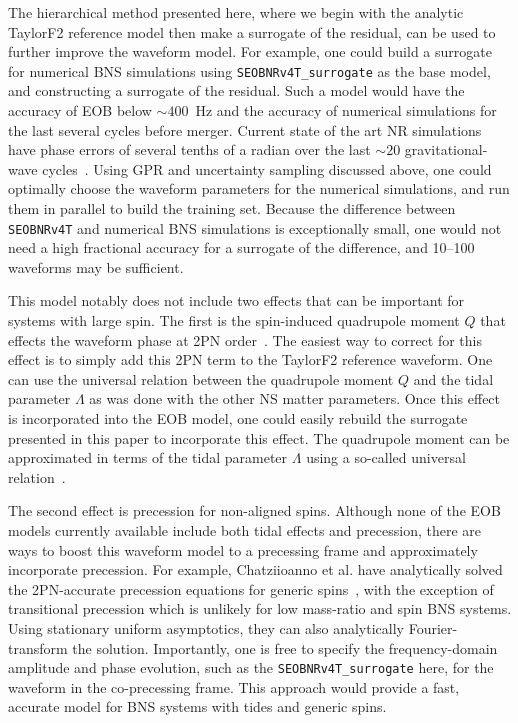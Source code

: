 \documentclass[prd,aps,letter,twocolumn,floatfix,notitlepage,nofootinbib]{revtex4-1}
\begin{document}
The hierarchical method presented here, where we begin with the analytic TaylorF2 reference model then make a surrogate of the residual, can be used to further improve the waveform model. For example, one could build a surrogate for numerical BNS simulations using \texttt{SEOBNRv4T\_surrogate} as the base model, and constructing a surrogate of the residual. Such a model would have the accuracy of EOB below $\sim 400$~Hz and the accuracy of numerical simulations for the last several cycles before merger. Current state of the art NR simulations have phase errors of several tenths of a radian over the last $\sim 20$ gravitational-wave cycles~\cite{DietrichHinderer2017, KiuchiKawaguchiKyutoku2017}. Using GPR and uncertainty sampling discussed above, one could optimally choose the waveform parameters for the numerical simulations, and run them in parallel to build the training set. Because the difference between \texttt{SEOBNRv4T} and numerical BNS simulations is exceptionally small, one would not need a high fractional accuracy for a surrogate of the difference, and 10--100 waveforms may be sufficient.

This model notably does not include two effects that can be important for systems with large spin. The first is the spin-induced quadrupole moment $Q$ that effects the waveform phase at 2PN order~\cite{Poisson1998}. The easiest way to correct for this effect is to simply add this 2PN term to the TaylorF2 reference waveform. One can use the universal relation between the quadrupole moment $Q$ and the tidal parameter $\Lambda$ as was done with the other NS matter parameters. Once this effect is incorporated into the EOB model, one could easily rebuild the surrogate presented in this paper to incorporate this effect. The quadrupole moment can be approximated in terms of the tidal parameter $\Lambda$ using a so-called universal relation~\cite{YagiYunes2013}.

The second effect is precession for non-aligned spins. Although none of the EOB models currently available include both tidal effects and precession, there are ways to boost this waveform model to a precessing frame and approximately incorporate precession. For example, Chatziioanno et al. have analytically solved the 2PN-accurate precession equations for generic spins~\cite{ChatziioannouKleinCornish2017a, ChatziioannouKleinCornish2017b}, with the exception of transitional precession which is unlikely for low mass-ratio and spin BNS systems. Using stationary uniform asymptotics, they can also analytically Fourier-transform the solution. Importantly, one is free to specify the frequency-domain amplitude and phase evolution, such as the \texttt{SEOBNRv4T\_surrogate} here, for the waveform in the co-precessing frame. This approach would provide a fast, accurate model for BNS systems with tides and generic spins.
\end{document}
